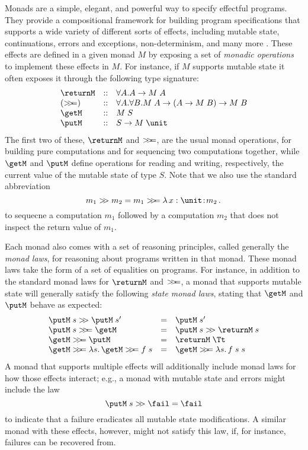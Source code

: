 \documentclass[preprint]{sigplanconf}
\begin{document}
Monads are a simple, elegant, and powerful way to specify effectful programs.
They provide a compositional framework for building program specifications that
supports a wide variety of different sorts of effects, including mutable state,
continuations, errors and exceptions, non-determinism, and many more
\cite{moggi91}.  These effects are defined in a given monad $M$ by exposing a
set of \emph{monadic operations} to implement these effects in $M$. For
instance, if $M$ supports mutable state it often exposes it through the following type signature:
\[
\begin{array}{lcl}
  \returnM & :: & \forall A. A \to M\;A \\
  (\bind) & :: & \forall A. \forall B. M\;A \to (A\to M\;B) \to M\;B \\
  \getM & :: & M\;S \\
  \putM & :: & S \to M\;\unit
\end{array}
\]
The first two of these, $\returnM$ and $>\!\!>\!\!=$, are the usual monad operations,
for building pure computations and for sequencing two computations together,
while $\getM$ and $\putM$ define operations for reading and writing,
respectively, the current value of the mutable state of type $S$. Note that
we also use the standard abbreviation
\[
m_1 \bindU m_2 = m_1 \bind \lamabs{x:\unit}{m_2}
\]
to sequecne a computation $m_1$ followed by a computation $m_2$ that does not
inspect the return value of $m_1$.


Each monad also comes with a set of reasoning principles, called generally the
\emph{monad laws}, for reasoning about programs written in that monad. These
monad laws take the form of a set of equalities on programs. For instance, in
addition to the standard monad laws for $\returnM$ and $>\!\!>\!\!=$, a monad that
supports mutable state will generally satisfy the following \emph{state monad
  laws}, stating that $\getM$ and $\putM$ behave as expected:
\[
\begin{array}{lcl}
  \putM\;s \bindU \putM\;s' & = & \putM\;s'\\
  \putM\;s \bind \getM & = & \putM\;s \bindU \returnM\;s \\
  \getM\bind\putM & = & \returnM\;\Tt \\
  \getM\bind \lamabsnot{s}{\getM\bind f\;s} & = & \getM\bind\lamabsnot{s}{f\;s\;s}
\end{array}
\]
A monad that supports multiple effects will additionally include monad laws for
how those effects interact; e.g., a monad with mutable state and errors might
include the law
\[
\putM\;s \bindU \fail = \fail
\]
to indicate that a failure eradicates all mutable state modifications.  A
similar monad with these effects, however, might not satisfy this law, if, for
instance, failures can be recovered from.
\end{document}
